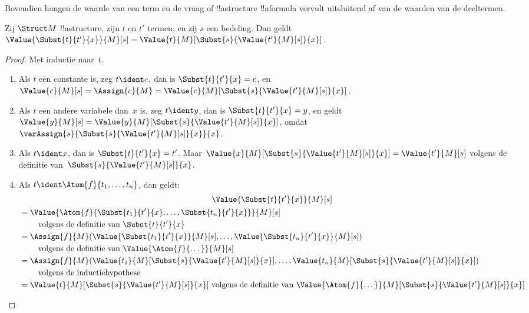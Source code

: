 \documentclass[openany]{memoir}
\begin{document}
Bovendien hangen de waarde van een term en de vraag of !!a{structure}
!!a{formula} vervult uitsluitend af van de waarden van de deeltermen.

\begin{prop}
Zij $\Struct M$ !!a{structure}, zijn $t$ en $t'$ termen, en zij $s$ een
bedeling. Dan geldt $\Value{\Subst{t}{t'}{x}}{M}[s] =
\Value{t}{M}[\Subst{s}{\Value{t'}{M}[s]}{x}]$.
\end{prop}

\begin{proof}
Met inductie naar~$t$.
\begin{enumerate}
\item Als $t$ een constante is, zeg $t\ident c$, dan is
  $\Subst{t}{t'}{x} = c$, en $\Value{c}{M}[s] = \Assign{c}{M} =
  \Value{c}{M}[\Subst{s}{\Value{t'}{M}[s]}{x}]$.

\item Als $t$ een andere variabele dan~$x$ is, zeg $t \ident y$, dan
  is $\Subst{t}{t'}{x} = y$, en geldt
  $\Value{y}{M}[s] =
  \Value{y}{M}[\Subst{s}{\Value{t'}{M}[s]}{x}]$, omdat
  $\varAssign{s}{\Subst{s}{\Value{t'}{M}[s]}{x}}{x}$.

\item Als $t \ident x$, dan is $\Subst{t}{t'}{x} = t'$. Maar
  $\Value{x}{M}[\Subst{s}{\Value{t'}{M}[s]}{x}] = \Value{t'}{M}[s]$
  volgens de definitie van~$\Subst{s}{\Value{t'}{M}[s]}{x}$.

\item Als $t \ident \Atom{f}{t_1,\dots,t_n}$, dan geldt:
\begin{multline*}
  \Value{\Subst{t}{t'}{x}}{M}[s] \\
  \begin{aligned}[b]
& = \Value{\Atom{f}{\Subst{t_1}{t'}{x}, \dots, \Subst{t_n}{t'}{x}}}{M}[s]\\
& \qquad    \text{ volgens de definitie van $\Subst{t}{t'}{x}$}\\
& = \Assign{f}{M}(\Value{\Subst{t_1}{t'}{x}}{M}[s], \dots,
    \Value{\Subst{t_n}{t'}{x}}{M}[s])\\
    & \qquad  \text{ volgens de definitie van $\Value{\Atom{f}{\dots}}{M}[s]$}\\
& = \Assign{f}{M}(\Value{t_1}{M}[\Subst{s}{\Value{t'}{M}[s]}{x}], \dots,
   \Value{t_n}{M}[\Subst{s}{\Value{t'}{M}[s]}{x}])\\
& \qquad    \text{ volgens de inductiehypothese}\\
& = \Value{t}{M}[\Subst{s}{\Value{t'}{M}[s]}{x}]
    \text{ volgens de definitie van $\Value{\Atom{f}{\dots}}{M}[\Subst{s}{\Value{t'}{M}[s]}{x}]$}
  \end{aligned}
\end{multline*}
\end{enumerate}
\end{proof}
\end{document}

